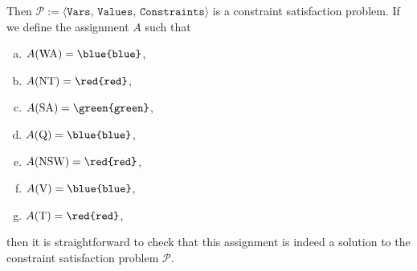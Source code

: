 Then $\mathcal{P} := \langle \texttt{Vars},\, \texttt{Values},\, \texttt{Constraints} \rangle$ is a constraint satisfaction problem.  
If we define the assignment $A$ such that
\begin{enumerate}[(a)]
\item $A(\mathrm{WA}) = \texttt{\blue{blue}}$,
\item $A(\mathrm{NT}) = \texttt{\red{red}}$,
\item $A(\mathrm{SA}) = \texttt{\green{green}}$,
\item $A(\mathrm{Q}) = \texttt{\blue{blue}}$,
\item $A(\mathrm{NSW}) = \texttt{\red{red}}$,
\item $A(\mathrm{V}) = \texttt{\blue{blue}}$,
\item $A(\mathrm{T}) = \texttt{\red{red}}$,
\end{enumerate}
then it is straightforward to check that this assignment is indeed a solution to the constraint satisfaction problem $\mathcal{P}$.

